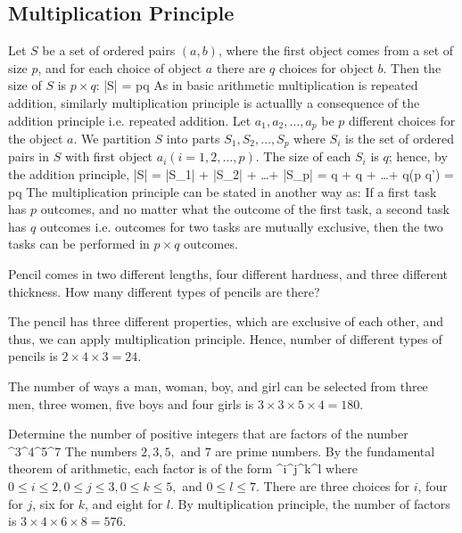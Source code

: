\subsection{Multiplication Principle}
Let $S$ be a set of ordered pairs $(a, b)$, where the first object comes from a set of size $p$, and for each choice of object $a$
there are $q$ choices for object $b$. Then the size of $S$ is $p\times q$:
\startformula |S| = p\times q\stopformula
As in basic arithmetic multiplication is repeated addition, similarly multiplication principle is actuallly a consequence of the
addition principle i.e. repeated addition. Let $a_1, a_2, \ldots, a_p$ be $p$ different choices for the object $a$. We partition
$S$ into parts $S_1, S_2, \ldots, S_p$ where $S_i$ is the set of ordered pairs in $S$ with first object $a_i(i = 1, 2, \ldots,
p)$. The size of each $S_i$ is $q$; hence, by the addition principle,
\startformula |S| = |S_1| + |S_2| + \ldots + |S_p|\stopformula
\startformula = q + q + \ldots + q(p q')\stopformula
\startformula = p\times q\stopformula
The multiplication principle can be stated in another way as: If a first task has $p$ outcomes, and no matter what the outcome of
the first task, a second task has $q$ outcomes i.e. outcomes for two tasks are mutually exclusive, then the two tasks can be
performed in $p\times q$ outcomes.

 Pencil comes in two different lengths, four different hardness, and three different thickness. How many
different types of pencils are there?

The pencil has three different properties, which are exclusive of each other, and thus, we can apply multiplication
principle. Hence, number of different types of pencils is $2\times4\times3 = 24$.

 The number of ways a man, woman, boy, and girl can be selected from three men, three women, five boys and
four girls is $3\times3\times5\times4 = 180$.

 Determine the number of positive integers that are factors of the number
^3^4^5^7\stopformula
The numbers $2, 3, 5,$ and $7$ are prime numbers. By the fundamental theorem of arithmetic, each factor is of the form
^i^j^k^l\stopformula
where $0\leq i\leq2, 0\leq j\leq3, 0\leq k\leq5,$ and $0\leq l\leq7$. There are three choices for $i$, four for $j$, six for $k$, and
eight for $l$. By multiplication principle, the number of factors is $3\times4\times6\times8 = 576$.

